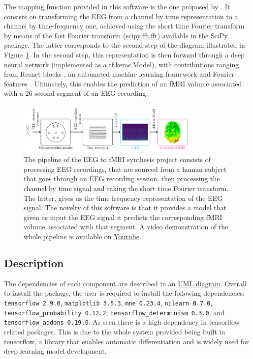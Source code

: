 The mapping function provided in this software is the one proposed by \cite{calhas2022eeg}. It consists on transforming the EEG from a channel by time representation to a channel by time-frequency one, achieved using the short time Fourier transform \cite{allen1977short} by means of the fast Fourier transform (\href{https://docs.scipy.org/doc/scipy/reference/generated/scipy.fft.fft.html}{scipy.fft.fft}) available in the SciPy package. The latter corresponds to the second step of the diagram illustrated in Figure \ref{fig:pipeline}. In the second step, this representation is then forward through a deep neural network (implemented as a \href{https://www.tensorflow.org/api_docs/python/tf/keras/Model}{tf.keras.Model}), with contributions ranging from Resnet blocks \cite{he2016deep}, an automated machine learning framework \cite{calhas2022automatic} and Fourier features \cite{tancik2020fourier}. Ultimately, this enables the prediction of an fMRI volume associated with a $26$ second segment of an EEG recording.

\begin{figure}[t]
    \centering
    \includegraphics[width=0.8\textwidth]{figures/diagram.png}
    \caption{The pipeline of the EEG to fMRI synthesis project consists of processing EEG recordings, that are sourced from a human subject that goes through an EEG recording session, then processing the channel by time signal and taking the short time Fourier transform. The latter, gives us the time frequency representation of the EEG signal. The novelty of this software is that it provides a model that given as input the EEG signal it predicts the corresponding fMRI volume associated with that segment. A video demonstration of the whole pipeline is available on \href{https://youtu.be/47uJbI0hU_I}{Youtube}.}
    \label{fig:pipeline}
\end{figure}

\subsection{Description}\label{section:description}

The dependencies of each component are described in an \href{https://github.com/eeg-to-fmri/eeg-to-fmri/blob/main/project_UML.pdf}{UML diagram}. Overall to install the package, the user is required to install the following dependencies: \texttt{tensorflow 2.9.0}, \texttt{matplotlib 3.5.3}, \texttt{mne 0.23.4}, \texttt{nilearn 0.7.0}, \texttt{tensorflow\_probability 0.12.2}, \texttt{tensorflow\_determinism 0.3.0}, and \texttt{tensorflow\_addons 0.19.0}. As seen there is a high dependency in tensorflow related packages. This is due to the whole system provided being built in tensorflow, a library that enables automatic differentiation and is widely used for deep learning model development.

